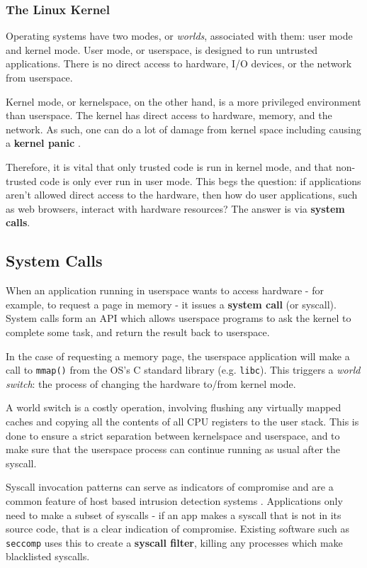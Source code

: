 \subsubsection{The Linux Kernel}
Operating systems have two modes, or \textit{worlds}, associated with them: user
mode and kernel mode. User mode, or userspace, is designed to run untrusted 
applications. There is no direct access to hardware, I/O devices, or the 
network from userspace.

Kernel mode, or kernelspace, on the other hand, is a more privileged environment
than userspace. The kernel has direct access to hardware, memory, and the
network. As such, one can do a lot of damage from kernel space including causing
a \textbf{kernel panic} \cite{panic9}.

Therefore, it is vital that only trusted code is run in kernel mode, and that
non-trusted code is only ever run in user mode. This begs the question: if
applications aren't allowed direct access to the hardware, then how do user
applications, such as web browsers, interact with hardware resources? The answer
is via \textbf{system calls}.

\subsection{System Calls}

When an application running in userspace wants to access hardware - for example,
to request a page in memory - it issues a \textbf{system call} (or syscall). System calls
form an \ac{API} which allows userspace programs to ask the kernel to complete some
task, and return the result back to userspace.

In the case of requesting a memory page, the userspace application will make a
call to \texttt{mmap()} from the \ac{OS}'s C standard library (e.g. \texttt{libc}).
This triggers a \textit{world switch}: the process of changing the hardware
to/from kernel mode.

A world switch is a costly operation, involving flushing any virtually mapped
caches and copying all the contents of all \ac{CPU} registers to the user stack. This
is done to ensure a strict separation between kernelspace and userspace, and to
make sure that the userspace process can continue running as usual after the
syscall.

Syscall invocation patterns can serve as indicators of compromise
and are a common feature of host based intrusion detection systems \cite{10.1145/3214304}. 
Applications only need to make a subset of syscalls
- if an app makes a syscall that is not in its source code, that is a clear
indication of compromise. Existing software such as \texttt{seccomp} uses this
to create a \textbf{syscall filter}, killing any processes which make
blacklisted syscalls. 

